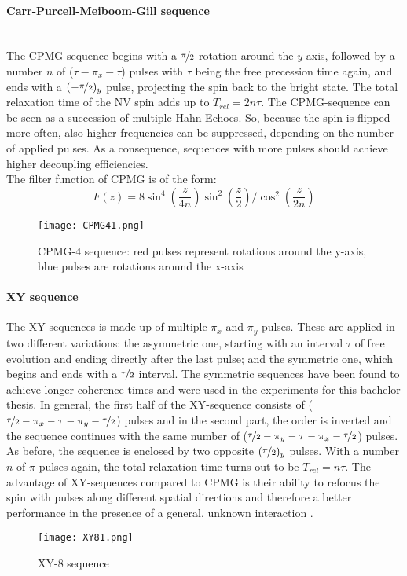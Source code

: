 \documentclass[12pt,a4paper]{article}
\begin{document}
\paragraph{Carr-Purcell-Meiboom-Gill sequence}\mbox{}\\
The CPMG sequence begins with a $\nicefrac{\pi}{2}$ rotation around the $y$ axis, followed by a number $n$ of ($\tau-\pi_x-\tau$) pulses with $\tau$ being the free precession time again, and ends with a $(-\nicefrac{\pi}{2})_y$ pulse, projecting the spin back to the bright state. The total relaxation time of the NV spin adds up to $T_{rel}=2n\tau$. The CPMG-sequence can be seen as a succession of multiple Hahn Echoes. So, because the spin is flipped more often, also higher frequencies can be suppressed, depending on the number of applied pulses. As a consequence, sequences with more pulses should achieve higher decoupling efficiencies.\\
The filter function of CPMG is of the form:
\begin{equation} F(z)=8\sin^4\left(\frac{z}{4n}\right)\sin^2\left(\frac{z}{2}\right)/\cos^2\left(\frac{z}{2n}\right)
\end{equation}
\begin{figure}[H]
\centering
\texttt{[image: CPMG41.png]} 
\caption{CPMG-4 sequence: red pulses represent rotations around the y-axis, blue pulses are rotations around the x-axis}
\end{figure} 
\paragraph{XY sequence}
The XY sequences is made up of multiple $\pi_x$ and $\pi_y$ pulses. These are applied in two different variations: the asymmetric one, starting with an interval $\tau$ of free evolution and ending directly after the last pulse; and the symmetric one, which begins and ends with a $\nicefrac{\tau}{2}$ interval. The symmetric sequences have been found to achieve longer coherence times\cite{sas}\cite{sas2} and were used in the experiments for this bachelor thesis. In general, the first half of the XY-sequence consists of ($\nicefrac{\tau}{2}-\pi_x-\tau-\pi_y-\nicefrac{\tau}{2}$) pulses and in the second part, the order is inverted and the sequence continues with the same number of ($\nicefrac{\tau}{2}-\pi_y-\tau-\pi_x-\nicefrac{\tau}{2}$) pulses. As before, the sequence is enclosed by two opposite $(\nicefrac{\pi}{2})_y$ pulses. With a number $n$ of $\pi$ pulses again, the total relaxation time turns out to be $T_{rel}=n\tau$. The advantage of XY-sequences compared to CPMG is their ability to refocus the spin with pulses along different spatial directions and therefore a better performance in the presence of a general, unknown interaction \cite{dd}\cite{rdc}.
\begin{figure}[H]
\centering
\texttt{[image: XY81.png]} 
\caption{XY-8 sequence}
\end{figure} 
\end{document}
